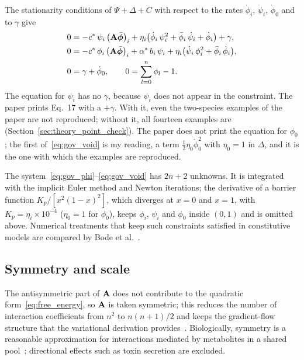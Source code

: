 The stationarity conditions of $\dot\Psi+\Delta+C$ with respect to the rates
$\dot\phi_i$, $\dot\psi_i$, $\dot\phi_0$ and to $\gamma$ give
\begin{align}
  0 &= -c^*\,\psi_i\,\bigl(\mathbf{A}\bar{\boldsymbol{\phi}}\bigr)_i
      + \eta_i\bigl(\dot\phi_i\,\psi_i^2 + \bar\phi_i\,\dot\psi_i + \dot\phi_i\bigr)
      + \gamma,
  \label{eq:gov_phi}\\
  0 &= -c^*\,\phi_i\,\bigl(\mathbf{A}\bar{\boldsymbol{\phi}}\bigr)_i
      + \alpha^*\,b_i\,\psi_i
      + \eta_i\bigl(\dot\psi_i\,\phi_i^2 + \bar\phi_i\,\dot\phi_i\bigr),
  \label{eq:gov_psi}\\
  0 &= \gamma + \dot\phi_0, \qquad
  0 = \sum_{l=0}^{n}\phi_l - 1 .
  \label{eq:gov_void}
\end{align}
The equation for $\psi_i$ has no $\gamma$, because $\psi_i$ does not appear in
the constraint. The paper prints Eq.~17 with a $+\gamma$. With it, even the
two-species examples of the paper are not reproduced; without it, all fourteen
examples are (Section~\ref{sec:theory_point_check}). The paper does not print the
equation for $\phi_0$; the first of~\eqref{eq:gov_void} is my reading, a term
$\tfrac12\eta_0\dot\phi_0^2$ with $\eta_0=1$ in $\Delta$, and it is the one with
which the examples are reproduced.

The system~\eqref{eq:gov_phi}--\eqref{eq:gov_void} has $2n+2$ unknowns. It is
integrated with the implicit Euler method and Newton iterations; the derivative of a barrier function
$K_p/[x^2(1-x)^2]$, which diverges at $x=0$ and $x=1$, with $K_p=\eta_i\times10^{-4}$ ($\eta_0=1$ for $\phi_0$), keeps $\phi_i$, $\psi_i$ and $\phi_0$
inside $(0,1)$ and is omitted above. Numerical treatments that keep such
constraints satisfied in constitutive models are compared by Bode et
al.~\cite{Bode2025ConstraintConforming}.

\subsection{Symmetry and scale}

The antisymmetric part of $\mathbf{A}$ does not contribute to the quadratic
form~\eqref{eq:free_energy}, so $\mathbf{A}$ is taken symmetric; this reduces the
number of interaction coefficients from $n^2$ to $n(n+1)/2$ and keeps the gradient-flow
structure that the variational derivation provides~\cite{JunkerBalzani2021ExtendedHamilton}.
Biologically, symmetry is a reasonable approximation for interactions mediated
by metabolites in a shared pool~\cite{Kolenbrander2010OralMultispecies}; directional
effects such as toxin secretion are excluded.

